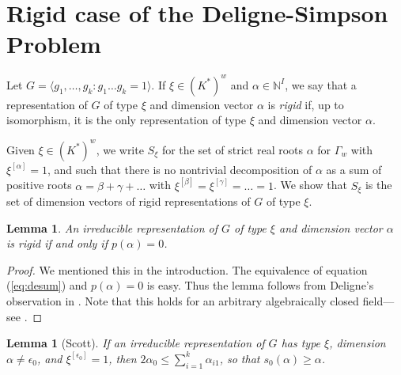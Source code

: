 \documentclass{amsart}
\theoremstyle{plain}
\newtheorem{lem}[thm]{Lemma}
\theoremstyle{definition}
\theoremstyle{remark}
\newcommand{\N}{\mathbb{N}}
\begin{document}
\section{Rigid case of the Deligne-Simpson Problem}\label{s:rigid}
Let $G = \langle g_1,\dots,g_k : g_1\dots g_k=1 \rangle$.
If $\xi\in (K^*)^w$ and $\alpha\in\N^I$, we say that a representation
of $G$ of type $\xi$ and dimension vector $\alpha$ is \emph{rigid}
if, up to isomorphism, it is the only representation of type $\xi$ and dimension vector $\alpha$.

Given $\xi\in (K^*)^w$, we write $S_\xi$ for the set of
strict real roots $\alpha$ for $\Gamma_w$
with $\xi^{[\alpha]}=1$, and such that
there is no nontrivial decomposition of $\alpha$ as a sum of positive roots
$\alpha = \beta+\gamma+\dots$
with $\xi^{[\beta]} = \xi^{[\gamma]} = \dots = 1$.
We show that $S_\xi$ is the set of dimension vectors of rigid representations
of $G$ of type $\xi$.



\begin{lem}\label{l:decond}
An irreducible representation of $G$ of type $\xi$ and dimension vector $\alpha$
is rigid if and only if $p(\alpha)=0$.
\end{lem}


\begin{proof}
We mentioned this in the introduction.
The equivalence of equation (\ref{eq:desum}) and $p(\alpha)=0$
is easy. Thus the lemma follows from Deligne's observation in \cite{Simp}.
Note that this holds for an arbitrary algebraically closed field---see \cite{SV}.
\end{proof}


\begin{lem}[Scott]
\label{l:scott}
If an irreducible representation of $G$ has type $\xi$, dimension $\alpha\neq \epsilon_0$,
and $\xi^{[\epsilon_0]}=1$, then $2\alpha_0 \le \sum_{i=1}^k \alpha_{i1}$, so that
$s_0(\alpha) \ge \alpha$.
\end{lem}
\end{document}
